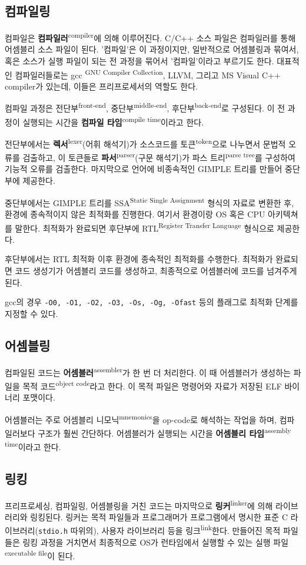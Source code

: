 \documentclass[runningheads]{../../../llncs}
\newcommand{\translation}[1]{\textsuperscript{#1}}
\begin{document}
\subsection{컴파일링}
컴파일은 \textbf{컴파일러}\translation{compiler}에 의해 이루어진다. C/C++ 소스 파일은 컴파일러를 통해 어셈블리 소스 파일이 된다. '컴파일'은 이 과정이지만, 일반적으로 어셈블링과 묶여서, 혹은 소스가 실행 파일이 되는 전 과정을 묶어서 '컴파일'이라고 부르기도 한다. 대표적인 컴파일러들로는 gcc \translation{GNU Compiler Collection}, LLVM, 그리고 MS Visual C++ compiler가 있는데, 이들은 프리프로세서의 역할도 한다.

컴파일 과정은 전단부\translation{front-end}, 중단부\translation{middle-end}, 후단부\translation{back-end}로 구성된다. 이 전 과정이 실행되는 시간을 \textbf{컴파일 타임}\translation{compile time}이라고 한다.

전단부에서는 \textbf{렉서}\translation{lexer}(어휘 해석기)가 소스코드를 토큰\translation{token}으로 나누면서 문법적 오류를 검출하고, 이 토큰들로 \textbf{파서}\translation{parser}(구문 해석기)가 파스 트리\translation{parse tree}를 구성하여 기능적 오류를 검출한다. 마지막으로 언어에 비종속적인 GIMPLE 트리를 만들어 중단부에 제공한다.

중단부에서는 GIMPLE 트리를 SSA\translation{Static Single Assignment} 형식의 자료로 변환한 후, 환경에 종속적이지 않은 최적화를 진행한다. 여기서 환경이랑 OS 혹은 CPU 아키텍쳐를 말한다. 최적화가 완료되면 후단부에 RTL\translation{Register Transfer Language} 형식으로 제공한다.

후단부에서는 RTL 최적화 이후 환경에 종속적인 최적화를 수행한다. 최적화가 완료되면 코드 생성기가 어셈블리 코드를 생성하고, 최종적으로 어셈블러에 코드를 넘겨주게 된다.

gcc의 경우 \texttt{-O0, -O1, -O2, -O3, -Os, -Og, -Ofast} 등의 플래그로 최적화 단계를 지정할 수 있다.

\subsection{어셈블링}
컴파일된 코드는 \textbf{어셈블러}\translation{assembler}가 한 번 더 처리한다. 이 때 어셈블러가 생성하는 파일을 목적 코드\translation{object code}라고 한다. 이 목적 파일은 명령어와 자료가 저장된 ELF 바이너리 포맷이다. 

어셈블러는 주로 어셈블리 니모닉\translation{mnemonics}을 op-code로 해석하는 작업을 하며, 컴파일러보다 구조가 훨씬 간단하다. 어셈블러가 실행되는 시간을 \textbf{어셈블리 타임}\translation{assembly time}이라고 한다.

\subsection{링킹}
프리프로세싱, 컴파일링, 어셈블링을 거친 코드는 마지막으로 \textbf{링커}\translation{linker}에 의해 라이브러리와 링킹된다. 링커는 목적 파일들과 프로그래머가 프로그램에서 명시한 표준 C 라이브러리(\texttt{stdio.h} 따위의), 사용자 라이브러리 등을 링크\translation{link}한다. 만들어진 목적 파일들은 링킹 과정을 거치면서 최종적으로 OS가 런타임에서 실행할 수 있는 실행 파일\translation{executable file}이 된다.
\end{document}
